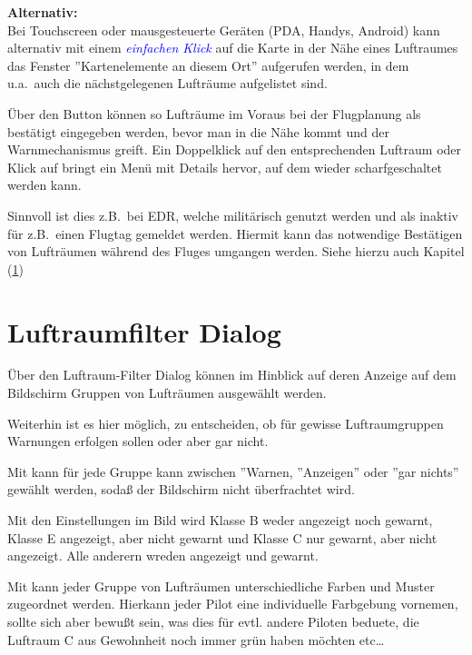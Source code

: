 \textbf{Alternativ:}\\
Bei Touchscreen oder mausgesteuerte Geräten (PDA, Handys, Android)
kann alternativ mit einem \textsl{\textcolor{blue}{einfachen Klick}} auf die Karte in der Nähe eines
 Luftraumes das Fenster \textsf{''Kartenelemente an diesem Ort}'' aufgerufen werden, in dem u.a.\ auch die nächstgelegenen Lufträume aufgelistet sind. 

Über den Button  können so Lufträume im Voraus bei der Flugplanung als bestätigt eingegeben werden, bevor man in die Nähe kommt und der Warnmechanismus greift.
Ein Doppelklick auf den entsprechenden Luftraum oder Klick auf  bringt ein Menü mit Details hervor, auf dem wieder scharfgeschaltet werden kann.

Sinnvoll ist dies z.B.\ bei EDR, welche militärisch genutzt werden und als inaktiv für z.B.\
einen Flugtag gemeldet werden. Hiermit kann das notwendige Bestätigen von
Lufträumen während des Fluges umgangen werden.  Siehe hierzu auch Kapitel (\ref{sec:airspace-filter})

\section{Luftraumfilter Dialog}\label{sec:airspace-filter} 

Über den Luftraum-Filter Dialog können im Hinblick auf deren Anzeige auf dem Bildschirm Gruppen von Lufträumen  ausgewählt werden. 

Weiterhin ist es hier möglich, zu entscheiden, ob für gewisse Luftraumgruppen Warnungen erfolgen sollen oder aber gar nicht. 
\menulabel{\button{Kartenanzeige}\blink\button{Luftraum}}

Mit kann für jede Gruppe kann zwischen ''Warnen, ''Anzeigen'' oder ''gar nichts'' gewählt werden, sodaß der Bildschirm nicht überfrachtet wird. 

Mit den Einstellungen im Bild wird Klasse B weder angezeigt noch gewarnt, Klasse E angezeigt, aber nicht gewarnt und Klasse C nur gewarnt, aber nicht angezeigt. Alle anderern wreden angezeigt und gewarnt.  

  Mit  kann jeder Gruppe von Lufträumen unterschiedliche Farben und Muster zugeordnet werden. Hierkann jeder Pilot eine individuelle Farbgebung vornemen, sollte sich aber bewußt sein, was dies für evtl. andere Piloten beduete, die Luftraum C aus Gewohnheit noch immer grün haben möchten etc\dots  
 

